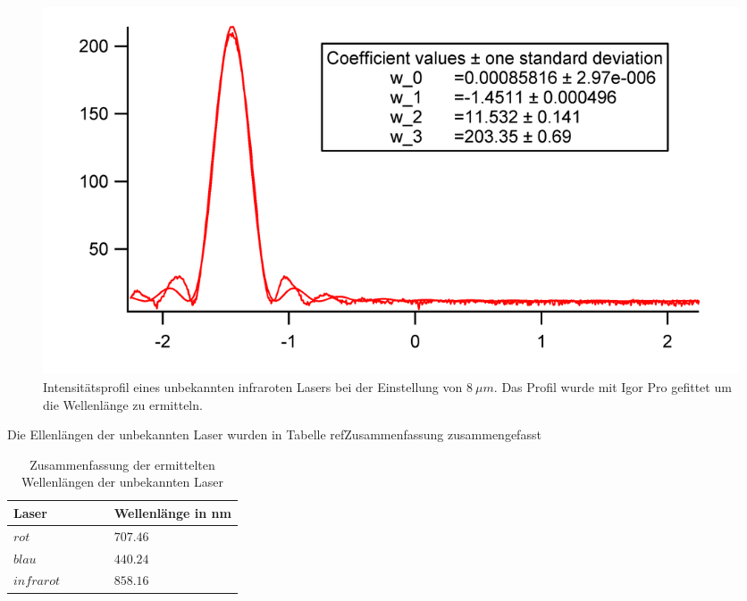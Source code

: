 \begin{figure}[H]	\centering	
	\begin{minipage}{1\textwidth}
		\includegraphics[width=\columnwidth]{180618/Graph_IR.png}
	\end{minipage}
	\caption{Intensitätsprofil eines unbekannten infraroten Lasers bei der Einstellung von $8~\mu m$. Das Profil wurde mit Igor Pro gefittet um die Wellenlänge zu ermitteln. }
	\label{U_IR}
\end{figure}
Die Ellenlängen der unbekannten Laser wurden in Tabelle ref{Zusammenfassung} zusammengefasst
\begin{table}[H]
\centering
\label{Zusammenfassung}
	\caption{Zusammenfassung der ermittelten Wellenlängen der unbekannten Laser }
	\begin{tabular}{C{0.15\linewidth}|C{0.15\linewidth}}
		Laser & Wellenlänge in nm\\
		\hline \addlinespace[1ex] 
		$ rot $ & $707.46$\\
		$ blau $ & $440.24$\\
		$ infrarot $ & $858.16$\\
	\end{tabular}
\end{table}



%